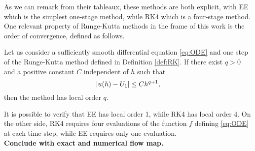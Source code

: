 As we can remark from their tableaux, these methods are both explicit, with EE which is the simplest one-stage method, while RK4 which is a four-stage method. \\
One relevant property of Runge-Kutta methods in the frame of this work is the order of convergence, defined as follows. 
\begin{definition} Let us consider a sufficiently smooth differential equation \eqref{eq:ODE} and one step of the Runge-Kutta method defined in Definition \ref{def:RK}. If there exist $q > 0$ and a positive constant $C$ independent of $h$ such that 
\begin{equation}
	\abs{u(h)-U_1} \leq Ch^{q+1},
\end{equation}
then the method has local order $q$. 
\end{definition} 
\noindent It is possible to verify \cite{HLW02} that EE has local order 1, while RK4 has local order 4. On the other side, RK4 requires four evaluations of the function $f$ defining \eqref{eq:ODE} at each time step, while EE requires only one evaluation. \\
\textbf{Conclude with exact and numerical flow map.}